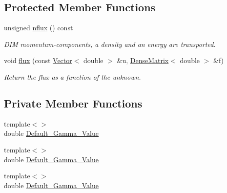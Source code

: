 \subsection*{Protected Member Functions}
\begin{DoxyCompactItemize}
\item 
unsigned \hyperlink{classoomph_1_1EulerEquations_a6bf35d53c8c306df8865192ef85cc08f}{nflux} () const
\begin{DoxyCompactList}\small\item\em D\+IM momentum-\/components, a density and an energy are transported. \end{DoxyCompactList}\item 
void \hyperlink{classoomph_1_1EulerEquations_a2596b0523e6e40d3ece23f9fd0c6d97c}{flux} (const \hyperlink{classoomph_1_1Vector}{Vector}$<$ double $>$ \&u, \hyperlink{classoomph_1_1DenseMatrix}{Dense\+Matrix}$<$ double $>$ \&f)
\begin{DoxyCompactList}\small\item\em Return the flux as a function of the unknown. \end{DoxyCompactList}\end{DoxyCompactItemize}
\subsection*{Private Member Functions}
\begin{DoxyCompactItemize}
\item 
{\footnotesize template$<$$>$ }\\double \hyperlink{classoomph_1_1EulerEquations_ac04a109a379577a830dc3700cbe8d311}{Default\+\_\+\+Gamma\+\_\+\+Value}
\item 
{\footnotesize template$<$$>$ }\\double \hyperlink{classoomph_1_1EulerEquations_a4cf291148209c3de66aab3cc2f332d2c}{Default\+\_\+\+Gamma\+\_\+\+Value}
\item 
{\footnotesize template$<$$>$ }\\double \hyperlink{classoomph_1_1EulerEquations_ac2392aa486ddf2806a0243d492a0d252}{Default\+\_\+\+Gamma\+\_\+\+Value}
\end{DoxyCompactItemize}

